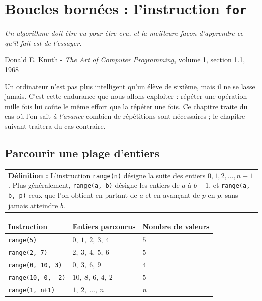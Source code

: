 \documentclass[a4paper,11pt,openany]{book}
\newcommand{\code}[1]{\texttt{\textcolor{codebleu}{#1}}}
\newcommand{\epigraphe}[2]{%
  \begin{list}{}{\leftmargin=1cm \rightmargin=1cm}\item[]
  \small\textit{#1}
  \end{list}
  \nopagebreak
  \hfill\small #2 \par\vspace{4mm}}
\renewcommand{\arraystretch}{1.4}
\begin{document}
\chapter[Boucles bornées : \texttt{for}]{Boucles bornées : l'instruction \texttt{for}}

\epigraphe{Un algorithme doit être vu pour être cru, et la meilleure façon d'apprendre ce qu'il fait est de l'essayer.}{Donald E. Knuth - \emph{The Art of Computer Programming}, volume 1, section 1.1, 1968}

Un ordinateur n'est pas plus intelligent qu'un élève de sixième, mais il ne se lasse jamais. C'est cette endurance que nous allons exploiter : répéter une opération mille fois lui coûte le même effort que la répéter une fois. Ce chapitre traite du cas où l'on sait \emph{à l'avance} combien de répétitions sont nécessaires ; le chapitre suivant traitera du cas contraire.

\section{Parcourir une plage d'entiers}

\begin{center}
\begin{tabularx}{15cm}{||X}
\noindent \textbf{\underline{Définition :}} L'instruction \code{range(n)} désigne la suite des entiers $0, 1, 2, \dots, n-1$. Plus généralement, \code{range(a, b)} désigne les entiers de $a$ à $b-1$, et \code{range(a, b, p)} ceux que l'on obtient en partant de $a$ et en avançant de $p$ en $p$, sans jamais atteindre $b$.
\end{tabularx}
\end{center}

\begin{center}
\renewcommand{\arraystretch}{1.5}
\begin{tabular}{|l|l|l|}
\hline
\rowcolor{orange!50} \textbf{Instruction} & \textbf{Entiers parcourus} & \textbf{Nombre de valeurs} \\
\hline
\code{range(5)} & $0,\ 1,\ 2,\ 3,\ 4$ & $5$ \\
\hline
\code{range(2, 7)} & $2,\ 3,\ 4,\ 5,\ 6$ & $5$ \\
\hline
\code{range(0, 10, 3)} & $0,\ 3,\ 6,\ 9$ & $4$ \\
\hline
\code{range(10, 0, -2)} & $10,\ 8,\ 6,\ 4,\ 2$ & $5$ \\
\hline
\code{range(1, n+1)} & $1,\ 2,\ \dots,\ n$ & $n$ \\
\hline
\end{tabular}
\end{center}
\end{document}
